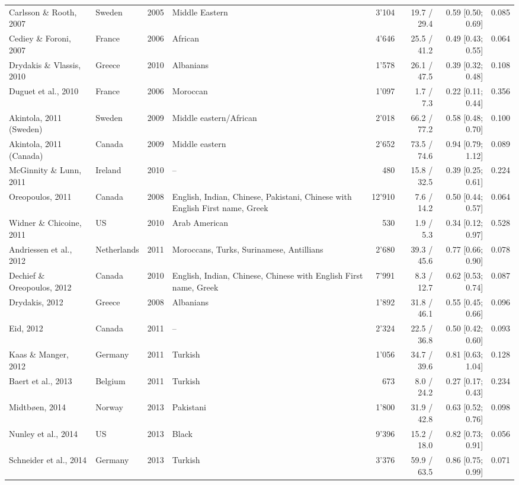 {\begin{longtable}{>{\raggedright\arraybackslash}p{3.4cm}lr>{\raggedright\arraybackslash}p{3.2cm}rrrr}
Carlsson \& Rooth, 2007 & Sweden & 2005 & Middle Eastern & 3'104 & 19.7 / 29.4 & 0.59 [0.50; 0.69] & 0.085 \\
Cediey \& Foroni, 2007 & France & 2006 & African & 4'646 & 25.5 / 41.2 & 0.49 [0.43; 0.55] & 0.064 \\
Drydakis \& Vlassis, 2010 & Greece & 2010 & Albanians & 1'578 & 26.1 / 47.5 & 0.39 [0.32; 0.48] & 0.108 \\
Duguet et al., 2010 & France & 2006 & Moroccan & 1'097 & 1.7 / 7.3 & 0.22 [0.11; 0.44] & 0.356 \\
Akintola, 2011 (Sweden) & Sweden & 2009 & Middle eastern/African & 2'018 & 66.2 / 77.2 & 0.58 [0.48; 0.70] & 0.100 \\
Akintola, 2011 (Canada) & Canada & 2009 & Middle eastern & 2'652 & 73.5 / 74.6 & 0.94 [0.79; 1.12] & 0.089 \\
McGinnity \& Lunn, 2011 & Ireland & 2010 & -- & 480 & 15.8 / 32.5 & 0.39 [0.25; 0.61] & 0.224 \\
Oreopoulos, 2011 & Canada & 2008 & English, Indian, Chinese, Pakistani, Chinese with English First name, Greek & 12'910 & 7.6 / 14.2 & 0.50 [0.44; 0.57] & 0.064 \\
Widner \& Chicoine, 2011 & US & 2010 & Arab American & 530 & 1.9 / 5.3 & 0.34 [0.12; 0.97] & 0.528 \\
Andriessen et al., 2012 & Netherlands & 2011 & Moroccans, Turks, Surinamese, Antillians & 2'680 & 39.3 / 45.6 & 0.77 [0.66; 0.90] & 0.078 \\
Dechief \& Oreopoulos, 2012 & Canada & 2010 & English, Indian, Chinese, Chinese with English First name, Greek & 7'991 & 8.3 / 12.7 & 0.62 [0.53; 0.74] & 0.087 \\
Drydakis, 2012 & Greece & 2008 & Albanians & 1'892 & 31.8 / 46.1 & 0.55 [0.45; 0.66] & 0.096 \\
Eid, 2012 & Canada & 2011 & -- & 2'324 & 22.5 / 36.8 & 0.50 [0.42; 0.60] & 0.093 \\
Kaas \& Manger, 2012 & Germany & 2011 & Turkish & 1'056 & 34.7 / 39.6 & 0.81 [0.63; 1.04] & 0.128 \\
Baert et al., 2013 & Belgium & 2011 & Turkish & 673 & 8.0 / 24.2 & 0.27 [0.17; 0.43] & 0.234 \\
Midtbøen, 2014 & Norway & 2013 & Pakistani & 1'800 & 31.9 / 42.8 & 0.63 [0.52; 0.76] & 0.098 \\
Nunley et al., 2014 & US & 2013 & Black & 9'396 & 15.2 / 18.0 & 0.82 [0.73; 0.91] & 0.056 \\
Schneider et al., 2014 & Germany & 2013 & Turkish & 3'376 & 59.9 / 63.5 & 0.86 [0.75; 0.99] & 0.071 \\

\end{longtable}}
